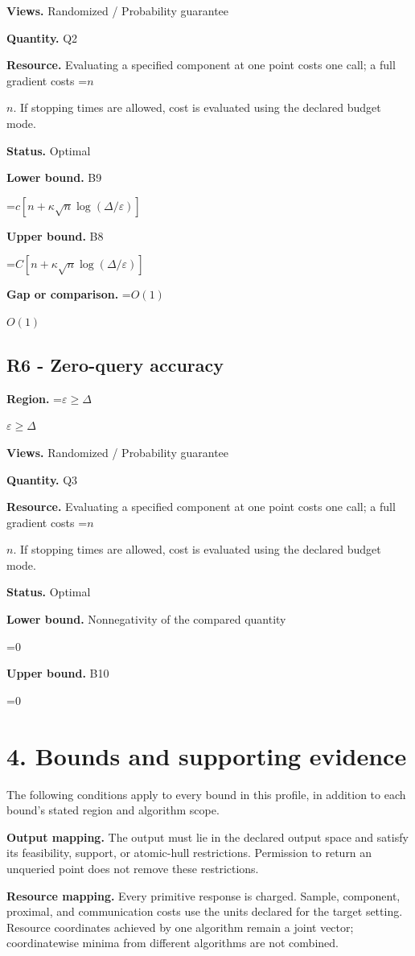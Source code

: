 \documentclass[10pt,a4paper]{article}
\newcommand{\AtlasMath}[1]{\par\begingroup\centering\setbox0=\hbox{$\displaystyle #1$}\ifdim\wd0>1.4\linewidth\typeout{ATLAS WIDE FORMULA: \the\wd0}\fi\ifdim\wd0>\linewidth\resizebox{\linewidth}{!}{\box0}\else\box0\fi\par\endgroup}
\newcommand{\AtlasInlineMath}[1]{\begingroup\setbox0=\hbox{$#1$}\ifdim\wd0>.4\linewidth\endgroup\AtlasMath{#1}\else\endgroup$#1$\fi}
\begin{document}
\textbf{Views.} Randomized / Probability guarantee

\textbf{Quantity.} Q2

\textbf{Resource.} Evaluating a specified component at one point costs one call; a full gradient costs \AtlasInlineMath{n}. If stopping times are allowed, cost is evaluated using the declared budget mode.

\textbf{Status.} Optimal

\textbf{Lower bound.} B9

\AtlasMath{c[n+\kappa\sqrt n\log(\Delta/\varepsilon)]}
\textbf{Upper bound.} B8

\AtlasMath{C[n+\kappa\sqrt n\log(\Delta/\varepsilon)]}
\textbf{Gap or comparison.} \AtlasInlineMath{O(1)}

\subsection{R6 - Zero-query accuracy}
\textbf{Region.} \AtlasInlineMath{\varepsilon\ge\Delta}

\textbf{Views.} Randomized / Probability guarantee

\textbf{Quantity.} Q3

\textbf{Resource.} Evaluating a specified component at one point costs one call; a full gradient costs \AtlasInlineMath{n}. If stopping times are allowed, cost is evaluated using the declared budget mode.

\textbf{Status.} Optimal

\textbf{Lower bound.} Nonnegativity of the compared quantity

\AtlasMath{0}
\textbf{Upper bound.} B10

\AtlasMath{0}
\section{4. Bounds and supporting evidence}
The following conditions apply to every bound in this profile, in addition to each bound's stated region and algorithm scope.

\textbf{Output mapping.} The output must lie in the declared output space and satisfy its feasibility, support, or atomic-hull restrictions. Permission to return an unqueried point does not remove these restrictions.

\textbf{Resource mapping.} Every primitive response is charged. Sample, component, proximal, and communication costs use the units declared for the target setting. Resource coordinates achieved by one algorithm remain a joint vector; coordinatewise minima from different algorithms are not combined.
\end{document}
